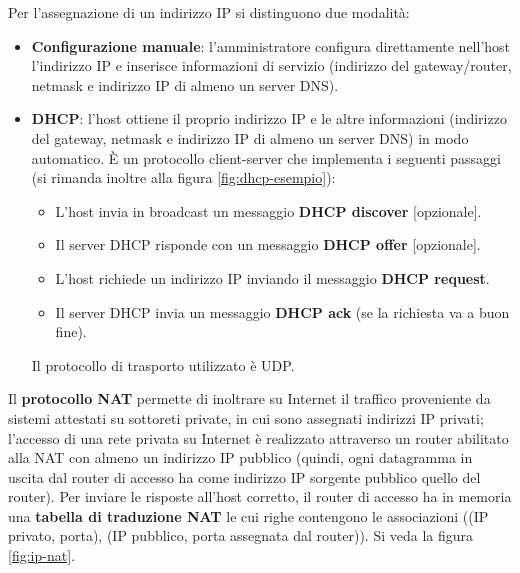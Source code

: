 \documentclass[11pt, italian, openany]{book}
\begin{document}
\begin{sloppypar}
Per l'assegnazione di un indirizzo IP si distinguono due modalit\`a:
\begin{itemize}[itemsep=0pt, parsep=0pt, topsep=0pt]
	\item \textbf{Configurazione manuale}: l'amministratore configura direttamente nell'host l'indirizzo IP e inserisce informazioni di servizio (indirizzo
	del gateway/router, netmask e indirizzo IP di almeno un server DNS).
	\item \textbf{DHCP}: l'host ottiene il proprio indirizzo IP e le altre informazioni (indirizzo del gateway, netmask e indirizzo IP di almeno un server DNS)
	in modo automatico. \`E un protocollo client-server che implementa i seguenti passaggi (si rimanda inoltre alla figura \ref{fig:dhcp-esempio}):
	\begin{itemize}
		\item L’host invia in broadcast un messaggio \textbf{DHCP discover} [opzionale].
		\item Il server DHCP risponde con un messaggio \textbf{DHCP offer} [opzionale].
		\item L’host richiede un indirizzo IP inviando il messaggio \textbf{DHCP request}.
		\item Il server DHCP invia un messaggio \textbf{DHCP ack} (se la richiesta va a buon fine).
	\end{itemize}
	Il protocollo di trasporto utilizzato \`e UDP.
\end{itemize}

{} \label{Protocollo NAT}
Il \textbf{protocollo NAT} permette di inoltrare su Internet il traffico proveniente da sistemi attestati su sottoreti private, in cui sono assegnati indirizzi
IP privati; l'accesso di una rete privata su Internet \`e realizzato attraverso un router abilitato alla NAT con almeno un indirizzo IP pubblico (quindi, ogni
datagramma in uscita dal router di accesso ha come indirizzo IP sorgente pubblico quello del router). Per inviare le risposte all'host corretto, il router
di accesso ha in memoria una \textbf{tabella di traduzione NAT} le cui righe contengono le associazioni ((IP privato, porta), (IP pubblico, porta assegnata
dal router)). Si veda la figura \ref{fig:ip-nat}.


\end{sloppypar}
\end{document}

